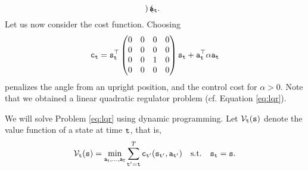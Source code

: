 \begin{example}
\begin{equation*}
\begin{pmatrix}
    \end{pmatrix} {\tt a}_{\tt t}.
\end{equation*}
Let us now consider the cost function. Choosing
\begin{equation*}
    {\tt c}_{\tt t} = {\tt s}_{\tt t}^\top  \begin{pmatrix} 0 & 0 & 0 & 0 \\ 
    0 & 0 & 0 & 0 \\
    0 & 0 & 1 & 0 \\
    0 & 0 & 0 & 0\end{pmatrix}{\tt s}_{\tt t} + {\tt a}_{\tt t}^\top \alpha {\tt a}_{\tt t}
\end{equation*}
penalizes the angle from an upright position, and the control cost for $\alpha > 0$. Note that we obtained a linear quadratic regulator problem (cf. Equation \ref{eq:lqr}).
\end{example}


We will solve Problem \ref{eq:lqr} using dynamic programming. Let $\mathcal{V}_{\tt t}({\tt s})$ denote the value function of a state at time ${\tt t}$, that is, 
$$\mathcal{V}_{\tt t}({\tt s}) = \min_{{\tt a}_{\tt t},\dots,{\tt a}_{\tt T}} \sum_{{\tt t}'={\tt t}}^T {\tt c}_{{\tt t}'}({\tt s}_{{\tt t}'}, {\tt a}_{{\tt t}'}) \quad \textrm{s.t.} \quad {\tt s}_{\tt t} = {\tt s}.$$


